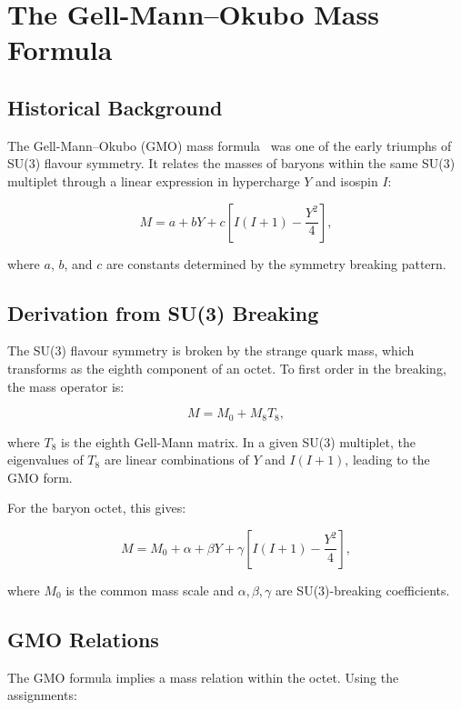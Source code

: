 \chapter{The Gell-Mann--Okubo Mass Formula}
\label{ch:gmo_formula}

\section{Historical Background}

The Gell-Mann--Okubo (GMO) mass formula~\cite{gellmann1961,okubo1962}
was one of the early triumphs of SU(3) flavour symmetry.  It relates the
masses of baryons within the same SU(3) multiplet through a linear
expression in hypercharge \(Y\) and isospin \(I\):

\begin{equation}
M = a + bY + c\left[I(I+1) - \frac{Y^2}{4}\right],
\label{eq:gmo_standard}
\end{equation}

where \(a\), \(b\), and \(c\) are constants determined by the symmetry
breaking pattern.

\section{Derivation from SU(3) Breaking}

The SU(3) flavour symmetry is broken by the strange quark mass, which
transforms as the eighth component of an octet.  To first order in the
breaking, the mass operator is:

\[
M = M_0 + M_8 T_8,
\]

where \(T_8\) is the eighth Gell-Mann matrix.  In a given SU(3) multiplet,
the eigenvalues of \(T_8\) are linear combinations of \(Y\) and \(I(I+1)\),
leading to the GMO form.

For the baryon octet, this gives:

\[
M = M_0 + \alpha + \beta Y + \gamma\left[I(I+1) - \frac{Y^2}{4}\right],
\label{eq:gmo_metatime}
\]

where \(M_0\) is the common mass scale and \(\alpha, \beta, \gamma\) are
SU(3)-breaking coefficients.

\section{GMO Relations}

The GMO formula implies a mass relation within the octet.  Using the
assignments:

